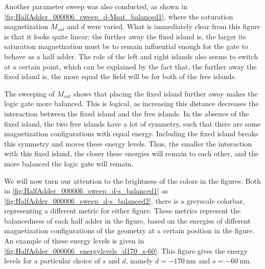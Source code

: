 \documentclass[11pt,a4paper,english]{article}
\begin{document}
Another parameter sweep was also conducted, as shown in \cref{fig:HalfAdder_000006_sweep_d-Msat_balanced1}, where the saturation magnetization $M_{sat}$ and $d$ were varied. What is immediately clear from this figure is that it looks quite linear: the further away the fixed island is, the larger its saturation magnetization must be to remain influential enough for the gate to behave as a half adder. The role of the left and right islands also seems to switch at a certain point, which can be explained by the fact that, the further away the fixed island is, the more equal the field will be for both of the free islands.

The sweeping of $M_{sat}$ shows that placing the fixed island further away makes the logic gate more balanced. This is logical, as increasing this distance decreases the interaction between the fixed island and the free islands. In the absence of the fixed island, the two free islands have a lot of symmetry, such that there are some magnetization configurations with equal energy. Including the fixed island breaks this symmetry and moves these energy levels. Thus, the smaller the interaction with this fixed island, the closer these energies will remain to each other, and the more balanced the logic gate will remain.

We will now turn our attention to the brightness of the colors in the figures. Both in \cref{fig:HalfAdder_000006_sweep_d-s_balanced1} as \cref{fig:HalfAdder_000006_sweep_d-s_balanced2}, there is a greyscale colorbar, representing a different metric for either figure. These metrics represent the balancedness of each half adder in the figure, based on the energies of different magnetization configurations of the geometry at a certain position in the figure. An example of these energy levels is given in \cref{fig:HalfAdder_000006_energylevels_d170_s-60}. This figure gives the energy levels for a particular choice of $s$ and $d$, namely $d=\SI{-170}{\nano\metre}$ and $s=\SI{-60}{\nano\metre}$.
\end{document}
